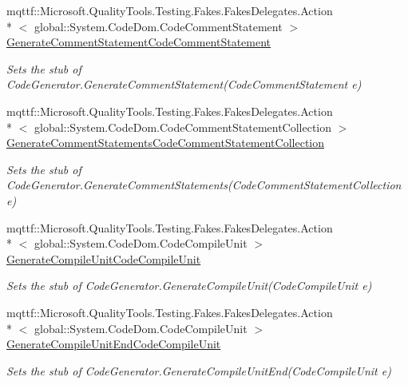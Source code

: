 \begin{DoxyCompactItemize}
mqttf\-::\-Microsoft.\-Quality\-Tools.\-Testing.\-Fakes.\-Fakes\-Delegates.\-Action\\*
$<$ global\-::\-System.\-Code\-Dom.\-Code\-Comment\-Statement $>$ \hyperlink{class_system_1_1_code_dom_1_1_compiler_1_1_fakes_1_1_stub_code_generator_aa81ef0c4edc7a463268fb8a3256b1e83}{Generate\-Comment\-Statement\-Code\-Comment\-Statement}
\begin{DoxyCompactList}\small\item\em Sets the stub of Code\-Generator.\-Generate\-Comment\-Statement(\-Code\-Comment\-Statement e)\end{DoxyCompactList}\item 
mqttf\-::\-Microsoft.\-Quality\-Tools.\-Testing.\-Fakes.\-Fakes\-Delegates.\-Action\\*
$<$ global\-::\-System.\-Code\-Dom.\-Code\-Comment\-Statement\-Collection $>$ \hyperlink{class_system_1_1_code_dom_1_1_compiler_1_1_fakes_1_1_stub_code_generator_a53bf2766d19c0972bc0a97bbd5bb4aee}{Generate\-Comment\-Statements\-Code\-Comment\-Statement\-Collection}
\begin{DoxyCompactList}\small\item\em Sets the stub of Code\-Generator.\-Generate\-Comment\-Statements(\-Code\-Comment\-Statement\-Collection e)\end{DoxyCompactList}\item 
mqttf\-::\-Microsoft.\-Quality\-Tools.\-Testing.\-Fakes.\-Fakes\-Delegates.\-Action\\*
$<$ global\-::\-System.\-Code\-Dom.\-Code\-Compile\-Unit $>$ \hyperlink{class_system_1_1_code_dom_1_1_compiler_1_1_fakes_1_1_stub_code_generator_ab7d337d37102917f8cd6e6a083282b68}{Generate\-Compile\-Unit\-Code\-Compile\-Unit}
\begin{DoxyCompactList}\small\item\em Sets the stub of Code\-Generator.\-Generate\-Compile\-Unit(\-Code\-Compile\-Unit e)\end{DoxyCompactList}\item 
mqttf\-::\-Microsoft.\-Quality\-Tools.\-Testing.\-Fakes.\-Fakes\-Delegates.\-Action\\*
$<$ global\-::\-System.\-Code\-Dom.\-Code\-Compile\-Unit $>$ \hyperlink{class_system_1_1_code_dom_1_1_compiler_1_1_fakes_1_1_stub_code_generator_a2720222b67e1bec8d92070878c7a945c}{Generate\-Compile\-Unit\-End\-Code\-Compile\-Unit}
\begin{DoxyCompactList}\small\item\em Sets the stub of Code\-Generator.\-Generate\-Compile\-Unit\-End(\-Code\-Compile\-Unit e)\end{DoxyCompactList}\item 

\end{DoxyCompactItemize}
